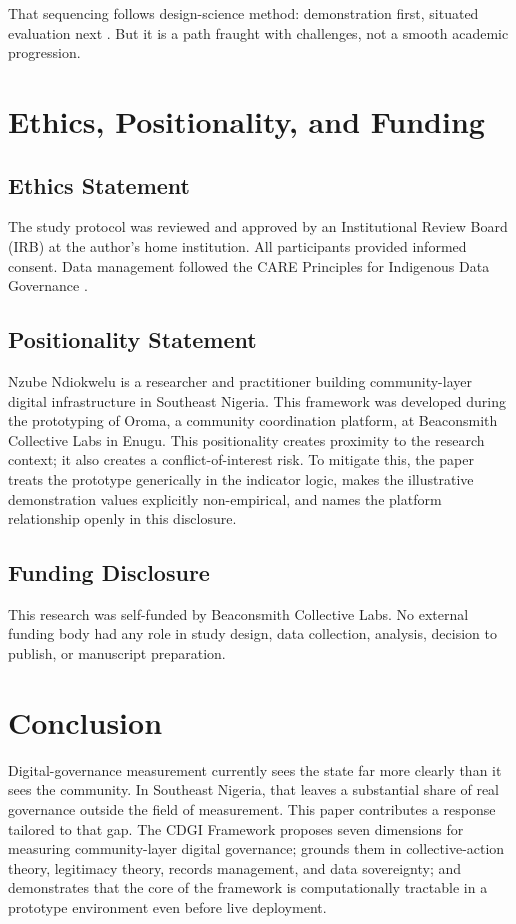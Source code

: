 \documentclass[sigconf]{acmart}
\begin{document}
That sequencing follows design-science method: demonstration first, situated evaluation next \cite{hevner2004, dresch2015}. But it is a path fraught with challenges, not a smooth academic progression.

\section{Ethics, Positionality, and Funding}

\subsection{Ethics Statement}

The study protocol was reviewed and approved by an Institutional Review Board (IRB) at the author's home institution. All participants provided informed consent. Data management followed the CARE Principles for Indigenous Data Governance \cite{carroll2020}.

\subsection{Positionality Statement}

Nzube Ndiokwelu is a researcher and practitioner building community-layer digital infrastructure in Southeast Nigeria. This framework was developed during the prototyping of Oroma, a community coordination platform, at Beaconsmith Collective Labs in Enugu. This positionality creates proximity to the research context; it also creates a conflict-of-interest risk. To mitigate this, the paper treats the prototype generically in the indicator logic, makes the illustrative demonstration values explicitly non-empirical, and names the platform relationship openly in this disclosure.

\subsection{Funding Disclosure}

This research was self-funded by Beaconsmith Collective Labs. No external funding body had any role in study design, data collection, analysis, decision to publish, or manuscript preparation.

\section{Conclusion}

Digital-governance measurement currently sees the state far more clearly than it sees the community. In Southeast Nigeria, that leaves a substantial share of real governance outside the field of measurement. This paper contributes a response tailored to that gap. The CDGI Framework proposes seven dimensions for measuring community-layer digital governance; grounds them in collective-action theory, legitimacy theory, records management, and data sovereignty; and demonstrates that the core of the framework is computationally tractable in a prototype environment even before live deployment.
\end{document}
